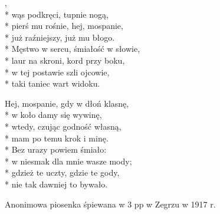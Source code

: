 \begin{lyrics}[longestline={\vin Męstwo w sercu, śmiałość w słowie,}]

,\\*
wąs podkręci, tupnie nogą,\\*
pierś mu rośnie, hej, mospanie,\\*
już raźniejszy, już mu błogo.\\*
\smallskip
\vin Męstwo w sercu, śmiałość w słowie,\\*
\vin laur na skroni, kord przy boku,\\*
\vin w tej postawie szli ojcowie,\\*
\vin taki taniec wart widoku.

Hej, mospanie, gdy w dłoń klasnę,\\*
w koło damy się wywinę,\\*
wtedy, czując godność własną,\\*
mam po temu krok i minę.\\*
\smallskip
\vin Bez urazy powiem śmiało:\\*
\vin w niesmak dla mnie wasze mody;\\*
\vin gdzież te uczty, gdzie te gody,\\*
\vin nie tak dawniej to bywało.
\end{lyrics}



\begin{info}Anonimowa piosenka śpiewana w 3 pp w Zegrzu w 1917 r.\end{info}

